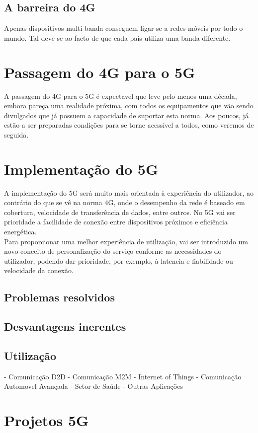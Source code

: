 \documentclass{llncs}
\begin{document}
\subsection{A barreira do 4G}
Apenas dispositivos multi-banda conseguem ligar-se a redes móveis por
todo o mundo. Tal deve-se ao facto de que cada país utiliza uma banda
diferente.

\section{Passagem do 4G para o 5G}
A passagem do 4G para o 5G é expectavel que leve pelo menos uma
década, embora pareça uma realidade próxima, com todos os 
equipamentos que vão sendo divulgados que já possuem a capacidade
de suportar esta norma. Aos poucos, já estão a ser preparadas
condições para se torne acessível a todos, como veremos de 
seguida.

\section{Implementação do 5G}
A implementação do 5G será muito mais orientada à experiência do
utilizador, ao contrário do que se vê na norma 4G, onde o 
desempenho da rede é baseado em cobertura, velocidade de 
transferência de dados, entre outros. No 5G vai ser prioridade a
facilidade de conexão entre dispositivos próximos e eficiência
energética.\\
Para proporcionar uma melhor experiência de utilização, vai ser
introduzido um novo conceito de personalização do serviço
conforme as necessidades do utilizador, podendo dar prioridade,
por exemplo, à latencia e fiabilidade ou velocidade da conexão.

\subsection{Problemas resolvidos}
\subsection{Desvantagens inerentes}
\subsection{Utilização}
- Comunicação D2D
- Comunicação M2M
- Internet of Things
- Comunicação Automovel Avançada
- Setor de Saúde
- Outras Aplicações
\section{Projetos 5G}
\end{document}
